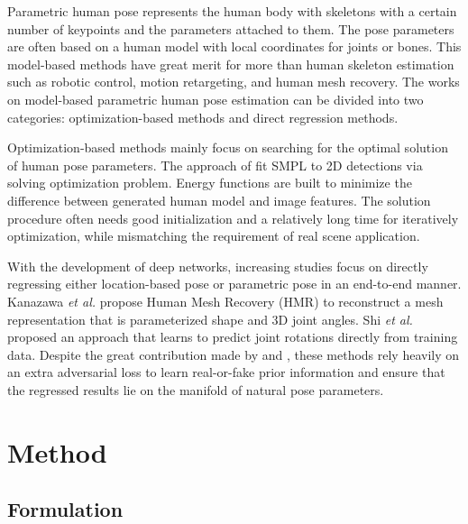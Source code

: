 \documentclass[lettersize,journal]{IEEEtran}
\begin{document}
Parametric human pose\cite{pavlakos2019expressive,grochow2004style,liu2013markerless,vlasic2008articulated} represents the human body with skeletons with a certain number of keypoints and the parameters attached to them. The pose parameters are often based on a human model with local coordinates for joints or bones. This model-based methods have great merit for more than human skeleton estimation such as robotic control\cite{csiszar2017solving}, motion retargeting\cite{villegas2018neural}, and human mesh recovery\cite{kanazawa2018end,bogo2016keep,fan2021revitalizing,mehta2017vnect}. The works on model-based parametric human pose estimation can be divided into two categories: optimization-based methods and direct regression methods.

Optimization-based methods mainly focus on searching for the optimal solution of human pose parameters\cite{ye2014real}. The approach of \cite{lassner2017unite} fit SMPL \cite{loper2015smpl} to 2D detections via solving optimization problem. Energy functions are built to minimize the difference between generated human model and image features. The solution procedure often needs good initialization and a relatively long time for iteratively optimization, while mismatching the requirement of real scene application. 

With the development of deep networks, increasing studies focus on directly regressing either location-based pose\cite{iskakov2019learnable,martinez2017simple,sun2018integral} or parametric pose\cite{villegas2018neural,shi2020motionet,pavllo2019modeling,kanazawa2018end} in an end-to-end manner. Kanazawa \emph{et al.} \cite{kanazawa2018end} propose Human Mesh Recovery (HMR) to reconstruct a mesh representation that is parameterized shape and 3D joint angles. Shi \emph{et al.} \cite{shi2020motionet} proposed an approach that learns to predict joint rotations directly from training data. Despite the great contribution made by \cite{kanazawa2018end} and \cite{shi2020motionet}, these methods rely heavily on an extra adversarial loss to learn real-or-fake prior information and ensure that the regressed results lie on the manifold of natural pose parameters.



\section{Method}
\label{sec:method}
\subsection{Formulation}
\label{subsec:pre}
\end{document}
